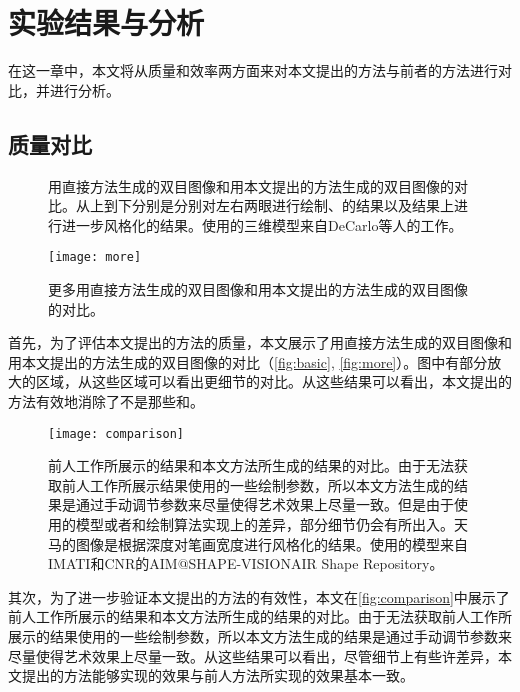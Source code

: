 \chapter{实验结果与分析}

在这一章中，本文将从质量和效率两方面来对本文提出的方法与前者的方法进行对比，并进行分析。

\section{质量对比}

\begin{figure}[tbh]
    \centering
    \caption{\label{fig:basic}
    用直接方法生成的双目图像和用本文提出的方法生成的双目图像的对比。从上到下分别是分别对左右两眼进行绘制、\stc{}的结果以及\stc{}结果上进行进一步风格化的结果。使用的三维模型来自DeCarlo等人的工作\cite{DFRS03}。
    }
\end{figure}
  
\begin{figure}[tbh]
    \centering
    \texttt{[image: more]}
    \caption{\label{fig:more}
    更多用直接方法生成的双目图像和用本文提出的方法生成的双目图像的对比。
    }
\end{figure}

首先，为了评估本文提出的方法的质量，本文展示了用直接方法生成的双目图像和用本文提出的方法生成的双目图像的对比（\autoref{fig:basic}, \autoref{fig:more}）。图中有部分放大的区域，从这些区域可以看出更细节的对比。从这些结果可以看出，本文提出的方法有效地消除了不是\stc{}那些\con{}和\scon{}。

\begin{figure}[tbh]
    \centering
    \texttt{[image: comparison]}
    \caption{\label{fig:comparison}
    前人工作\cite{kim2013stereoscopic,bukenberger2018stereo}所展示的结果和本文方法所生成的结果的对比。由于无法获取前人工作所展示结果使用的一些绘制参数，所以本文方法生成的结果是通过手动调节参数来尽量使得艺术效果上尽量一致。但是由于使用的模型或者\con{}和\scon{}绘制算法实现上的差异，部分细节仍会有所出入。天马的图像是根据深度对笔画宽度进行风格化的结果。使用的模型来自IMATI和CNR的AIM@SHAPE-VISIONAIR Shape Repository\cite{INR04}。}
\end{figure}  

其次，为了进一步验证本文提出的方法的有效性，本文在\autoref{fig:comparison}中展示了前人工作\cite{kim2013stereoscopic,bukenberger2018stereo}所展示的结果和本文方法所生成的结果的对比。由于无法获取前人工作所展示的结果使用的一些绘制参数，所以本文方法生成的结果是通过手动调节参数来尽量使得艺术效果上尽量一致。从这些结果可以看出，尽管细节上有些许差异，本文提出的方法能够实现的\stcy{}效果与前人方法所实现的效果基本一致。

